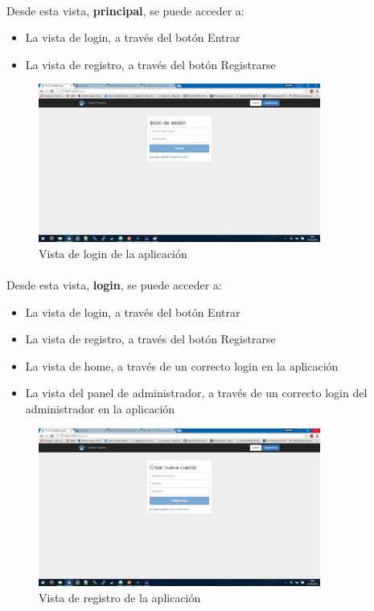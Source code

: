 \documentclass[a4paper]{article}
\begin{document}
\paragraph{} Desde esta vista, \textbf{principal}, se puede acceder a:
\begin{itemize}
	\item La vista de login, a través del botón Entrar
	\item La vista de registro, a través del botón Registrarse
\end{itemize}
\begin{figure}[H]
	\centering
	\includegraphics[width=350px]{img/login.png}
	\caption{Vista de login de la aplicación}
	\label{fig:diagarq}
\end{figure}
\paragraph{} Desde esta vista, \textbf{login}, se puede acceder a:
\begin{itemize}
	\item La vista de login, a través del botón Entrar
	\item La vista de registro, a través del botón Registrarse
	\item La vista de home, a través de un correcto login en la aplicación
	\item La vista del panel de administrador, a través de un correcto login del administrador en la aplicación
\end{itemize}
\begin{figure}[H]
	\centering
	\includegraphics[width=350px]{img/register.png}
	\caption{Vista de registro de la aplicación}
	\label{fig:diagarq}
\end{figure}
\end{document}
